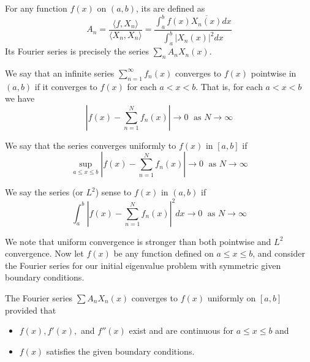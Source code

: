 \begin{definition}
    For any function $f(x)$ on $(a,b)$, its  are defined as 
    \begin{equation}
        \boxed{A_n = \frac{\langle f,X_n\rangle}{\langle X_n,X_n\rangle} = \frac{\int_a^bf(x)\overline{X_n(x)}dx}{\int_a^b|X_n(x)|^2dx}}
    \end{equation}
    Its Fourier series is precisely the series $\sum_nA_nX_n(x)$.
\end{definition}

\begin{definition}
    We say that an infinite series $\sum_{n=1}^{\infty}f_n(x)$ converges to $f(x)$ pointwise in $(a,b)$ if it converges to $f(x)$ for each $a < x < b$. That is, for each $a < x < b$ we have \begin{equation*}
        \left|f(x) - \sum_{n=1}^Nf_n(x)\right| \rightarrow 0\;\text{ as }N\rightarrow \infty
    \end{equation*}
\end{definition}

\begin{definition}
    We say that the series converges uniformly to $f(x)$ in $[a,b]$ if \begin{equation*}
        \sup\limits_{a\leq x \leq b}\left|f(x) - \sum_{n=1}^Nf_n(x)\right| \rightarrow 0\;\text{ as }N\rightarrow \infty
    \end{equation*}
\end{definition}

\begin{definition}
    We say the series  (or $L^2$) sense to $f(x)$ in $(a,b)$ if \begin{equation*}
        \int_a^b\left|f(x)-\sum_{n=1}^Nf_n(x)\right|^2dx \rightarrow 0\;\text{ as }N\rightarrow \infty
    \end{equation*}
\end{definition}

We note that uniform convergence is stronger than both pointwise and $L^2$ convergence. Now let $f(x)$ be any function defined on $a\leq x \leq b$, and consider the Fourier series for our initial eigenvalue problem with symmetric given boundary conditions.

\begin{theorem}
    The Fourier series $\sum A_nX_n(x)$ converges to $f(x)$ uniformly on $[a,b]$ provided that \begin{itemize}
        \item $f(x),f'(x),$ and $f''(x)$ exist and are continuous for $a \leq x \leq b$ and 
        \item $f(x)$ satisfies the given boundary conditions.
    \end{itemize}
\end{theorem}

